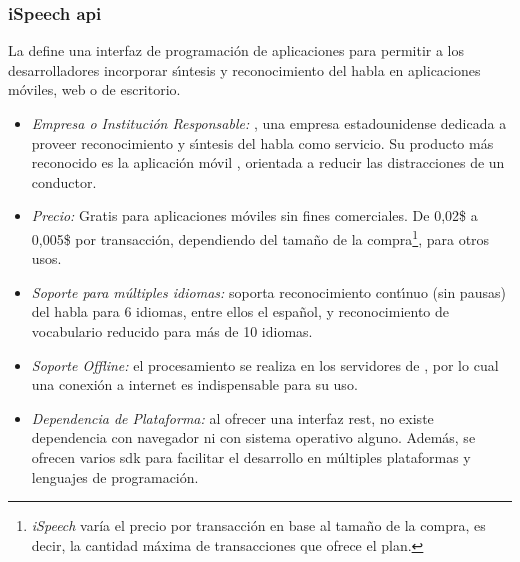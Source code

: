 \subsubsection{iSpeech \gls{api}}
\label{sec:ispeech}

La  \cite{iSpeech} define una interfaz de programaci\'on de aplicaciones para permitir
a los desarrolladores incorporar s{\'\i}ntesis y reconocimiento del habla en aplicaciones m\'oviles,
web o de escritorio.

\begin{itemize}
	\item \emph{Empresa o Instituci\'on Responsable:} , una empresa estadounidense dedicada a
	proveer reconocimiento y s{\'\i}ntesis del habla como servicio. Su producto m\'as reconocido es la aplicaci\'on m\'ovil
	, orientada a reducir las distracciones de un conductor.
	\item \emph{Precio:} Gratis para aplicaciones m\'oviles sin fines comerciales. De 0,02\$ a 0,005\$ por
        transacci\'on, dependiendo del tama\~no de la compra\footnote{\emph{iSpeech} var\'ia el precio por transacci\'on
    en base al tama\~no de la compra, es decir, la cantidad m\'axima de transacciones que ofrece el plan.}, para otros usos.
	\item \emph{Soporte para m\'ultiples idiomas:} soporta reconocimiento cont{\'\i}nuo (sin pausas) del habla para 6 idiomas,
	entre ellos el espa\~nol, y reconocimiento de vocabulario reducido para m\'as de 10 idiomas.
	\item \emph{Soporte Offline:} el procesamiento se realiza en los servidores de , por lo cual
	una conexi\'on a internet es indispensable para su uso.
	\item \emph{Dependencia de Plataforma:} al ofrecer una interfaz \gls{rest}, no existe dependencia con navegador
	ni con sistema operativo alguno. Adem\'as, se ofrecen varios \gls{sdk} para facilitar
	el desarrollo en m\'ultiples plataformas y lenguajes de programaci\'on.
\end{itemize}